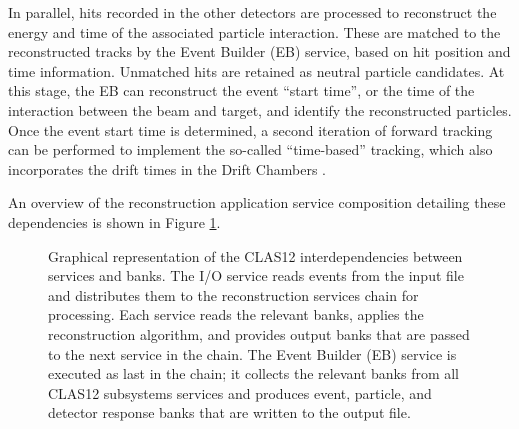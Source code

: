     In parallel, hits recorded in the other detectors are processed to reconstruct the energy and time of the associated particle interaction.
    These are matched to the reconstructed tracks by the Event Builder (EB) service, based on hit
    position and time information.
    Unmatched hits are retained as neutral particle candidates.
    At this stage, the EB can reconstruct the event ``start time'', or the time of the interaction between the beam and target, and identify the reconstructed particles.
    Once the event start time is determined, a second iteration of forward tracking can be performed to implement the so-called ``time-based'' tracking, which also incorporates the drift times in the Drift Chambers \cite{ziegler2020}.

    An overview of the reconstruction application service composition detailing these dependencies is shown in Figure \ref{fig::recon_chain}.

    \begin{figure}[t]
        \centering{}
        \caption[CLAS12 Reconstruction Chain.]{Graphical representation of the CLAS12 interdependencies between services and banks.
        The I/O service reads events from the input file and distributes them to the reconstruction services chain for processing.
        Each service reads the relevant banks, applies the reconstruction algorithm, and provides output banks that are passed to the next service in the chain.
        The Event Builder (EB) service is executed as last in the chain; it collects the relevant banks from all CLAS12 subsystems services and produces event, particle, and detector response banks that are written to the output file.}
        \label{fig::recon_chain}
    \end{figure}

    
    
